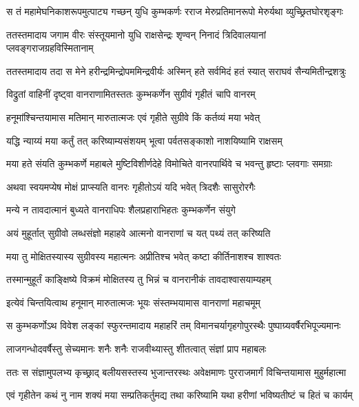 \twolineshloka
{स तं महामेघनिकाशरूपमुत्पाट्य गच्छन् युधि कुम्भकर्णः}
{रराज मेरुप्रतिमानरूपो मेरुर्यथा व्युच्छ्रितघोरशृङ्गः} %

\twolineshloka
{ततस्तमादाय जगाम वीरः संस्तूयमानो युधि राक्षसेन्द्रः}
{शृण्वन् निनादं त्रिदिवालयानां प्लवङ्गराजग्रहविस्मितानाम्} %

\twolineshloka
{ततस्तमादाय तदा स मेने हरीन्द्रमिन्द्रोपममिन्द्रवीर्यः}
{अस्मिन् हते सर्वमिदं हतं स्यात् सराघवं सैन्यमितीन्द्रशत्रुः} %

\twolineshloka
{विद्रुतां वाहिनीं दृष्ट्वा वानराणामितस्ततः}
{कुम्भकर्णेन सुग्रीवं गृहीतं चापि वानरम्} %

\twolineshloka
{हनूमांश्चिन्तयामास मतिमान् मारुतात्मजः}
{एवं गृहीते सुग्रीवे किं कर्तव्यं मया भवेत्} %

\twolineshloka
{यद्धि न्याय्यं मया कर्तुं तत् करिष्याम्यसंशयम्}
{भूत्वा पर्वतसङ्काशो नाशयिष्यामि राक्षसम्} %

\twolineshloka
{मया हते संयति कुम्भकर्णे महाबले मुष्टिविशीर्णदेहे}
{विमोचिते वानरपार्थिवे च भवन्तु हृष्टाः प्लवगाः समग्राः} %

\twolineshloka
{अथवा स्वयमप्येष मोक्षं प्राप्स्यति वानरः}
{गृहीतोऽयं यदि भवेत् त्रिदशैः सासुरोरगैः} %

\twolineshloka
{मन्ये न तावदात्मानं बुध्यते वानराधिपः}
{शैलप्रहाराभिहतः कुम्भकर्णेन संयुगे} %

\twolineshloka
{अयं मुहूर्तात् सुग्रीवो लब्धसंज्ञो महाहवे}
{आत्मनो वानराणां च यत् पथ्यं तत् करिष्यति} %

\twolineshloka
{मया तु मोक्षितस्यास्य सुग्रीवस्य महात्मनः}
{अप्रीतिश्च भवेत् कष्टा कीर्तिनाशश्च शाश्वतः} %

\twolineshloka
{तस्मान्मुहूर्तं काङ्क्षिष्ये विक्रमं मोक्षितस्य तु}
{भिन्नं च वानरानीकं तावदाश्वासयाम्यहम्} %

\twolineshloka
{इत्येवं चिन्तयित्वाथ हनूमान् मारुतात्मजः}
{भूयः संस्तम्भयामास वानराणां महाचमूम्} %

\twolineshloka
{स कुम्भकर्णोऽथ विवेश लङ्कां स्फुरन्तमादाय महाहरिं तम्}
{विमानचर्यागृहगोपुरस्थैः पुष्पाग्र्यवर्षैरभिपूज्यमानः} %

\twolineshloka
{लाजगन्धोदवर्षैस्तु सेच्यमानः शनैः शनैः}
{राजवीथ्यास्तु शीतत्वात् संज्ञां प्राप महाबलः} %

\twolineshloka
{ततः स संज्ञामुपलभ्य कृच्छ्राद् बलीयसस्तस्य भुजान्तरस्थः}
{अवेक्षमाणः पुरराजमार्गं विचिन्तयामास मुहुर्महात्मा} %

\twolineshloka
{एवं गृहीतेन कथं नु नाम शक्यं मया सम्प्रतिकर्तुमद्य}
{तथा करिष्यामि यथा हरीणां भविष्यतीष्टं च हितं च कार्यम्} %


